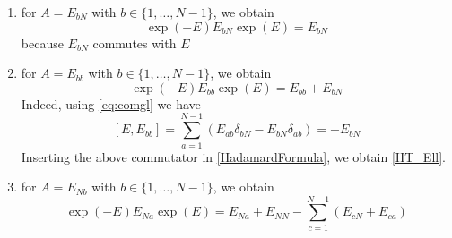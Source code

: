 \documentclass[10pt]{article}
\numberwithin{equation}{section}
\numberwithin{equation}{subsection}
\newcommand{\com}[1]{{ (* {\color{red}\small #1}*)}}
\begin{document}
\begin{enumerate}
    \item for $A=E_{b N}$ with $b\in \{1,\ldots,N-1\}$, we obtain 
    \begin{equation}\label{HT_El1}
        \exp{(-E)}E_{b N}\exp{(E)}=E_{b N}
    \end{equation}
    because $E_{b N}$ commutes with $E$
    \item for $A=E_{bb}$ with $b \in \{1,\ldots,N-1\}$, we obtain 
    \begin{equation}\label{HT_Ell}
        \exp{(-E)}E_{b b}\exp{(E)}=E_{b b}+E_{b N}
    \end{equation}
Indeed, using \eqref{eq:comgl} we have 
    \begin{equation}
       \left[E, E_{bb}\right]=\sum_{a=1}^{N-1}\left(E_{ab}\delta_{b N}-E_{b N}\delta_{ab}\right)=-E_{bN}
    \end{equation}
    Inserting the above commutator in \eqref{HadamardFormula}, we obtain \eqref{HT_Ell}.
    \item for $A=E_{Nb}$ with $b\in \{1,\ldots,N-1\}$, we obtain 
    \begin{equation}\label{HT-E1l}
        \exp{(-E)}E_{N a}\exp{(E)}=E_{Na}+E_{NN}-\sum_{c=1}^{N-1}\left(E_{cN}+E_{ca}\right)
    \end{equation}
    

\end{enumerate}
\end{document}
